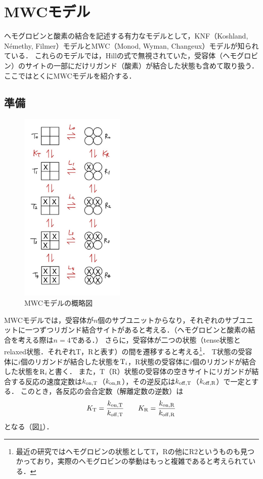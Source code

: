 \section{MWCモデル}

ヘモグロビンと酸素の結合を記述する有力なモデルとして，KNF（Koshland, N\'{e}methy, Filmer）モデルとMWC（Monod, Wyman, Changeux）モデルが知られている．
これらのモデルでは，Hillの式で無視されていた，受容体（ヘモグロビン）のサイトの一部にだけリガンド（酸素）が結合した状態も含めて取り扱う．
ここではとくにMWCモデルを紹介する．

\subsection{準備}

\begin{figure}[htbp]
  \centering
  \includegraphics[width=5cm]{mwc_scheme.jpg}
  \caption{MWCモデルの概略図}
  \label{fig:mwc_scheme}
\end{figure}

MWCモデルでは，受容体が$n$個のサブユニットからなり，それぞれのサブユニットに一つずつリガンド結合サイトがあると考える．（ヘモグロビンと酸素の結合を考える際は$n=4$である．）
さらに，受容体が二つの状態（tense状態とrelaxed状態．それぞれT，Rと表す）の間を遷移すると考える\footnote{最近の研究ではヘモグロビンの状態としてT，Rの他にR2というものも見つかっており，実際のヘモグロビンの挙動はもっと複雑であると考えられている\cite{review}．}．
T状態の受容体に$i$個のリガンドが結合した状態を$\ce{T_{$i$}}$，R状態の受容体に$i$個のリガンドが結合した状態を$\ce{R_{$i$}}$と書く．
また，T（R）状態の受容体の空きサイトにリガンドが結合する反応の速度定数は$k_{\mathrm{on},\ce{T}}$（$k_{\mathrm{on},\ce{R}}$），その逆反応は$k_{\mathrm{off},\ce{T}}$（$k_{\mathrm{off},\ce{R}}$）で一定とする．
このとき，各反応の会合定数（解離定数の逆数）は
\begin{equation}
  K_{\ce{T}} = \frac{k_{\mathrm{on},\ce{T}}}{k_{\mathrm{off},\ce{T}}} \qquad K_{\ce{R}} = \frac{k_{\mathrm{on},\ce{R}}}{k_{\mathrm{off},\ce{R}}}
\end{equation}
となる（図\ref{fig:mwc_scheme}）．

